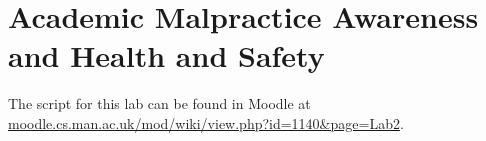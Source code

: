 \chapter{Academic Malpractice Awareness and Health and Safety}




The script for this lab can be found in Moodle at \href{http://moodle.cs.man.ac.uk/mod/wiki/view.php?id=1140&page=Lab2}{moodle.cs.man.ac.uk/mod/wiki/view.php?id=1140&page=Lab2}.

